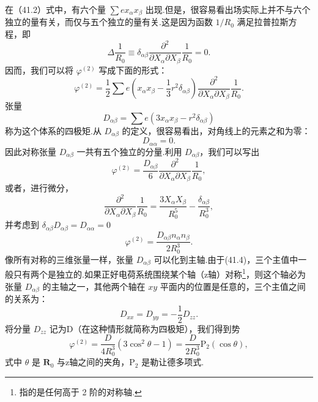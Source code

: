 在（41.2）式中，有六个量 $\sum ex_\alpha x_\beta$ 出现.但是，很容易看出场实际上并不与六个独立的量有关，而仅与五个独立的量有关.这是因为函数 $1/R_0$ 满足拉普拉斯方程，即
\begin{equation*}
  \Delta\frac{1}{R_0}\equiv\delta_{\alpha\beta}
  \frac{\partial^2}{\partial X_\alpha\partial X_\beta}\frac{1}{R_0}=0.
\end{equation*}
因而，我们可以将 $\varphi^{(2)}$ 写成下面的形式：
\begin{equation*}
  \varphi^{(2)}=\frac{1}{2}\sum e\left(x_\alpha x_\beta-\frac{1}{3}r^2\delta_{\alpha\beta}\right)
  \frac{\partial^2}{\partial X_\alpha\partial X_\beta}\frac{1}{R_0}.
\end{equation*}
张量
\begin{equation}
  D_{\alpha\beta}=\sum e(3x_\alpha x_\beta-r^2\delta_{\alpha\beta})
\end{equation}
称为这个体系的四极矩.从 $D_{\alpha\beta}$ 的定义，很容易看出，对角线上的元素之和为零：
\begin{equation}
  D_{\alpha\alpha}=0.
\end{equation}
因此对称张量 $D_{\alpha\beta}$ 一共有五个独立的分量.利用 $D_{\alpha\beta}$，我们可以写出
\begin{equation}
  \varphi^{(2)}=\frac{D_{\alpha\beta}}{6}
  \frac{\partial^2}{\partial X_\alpha\partial X_\beta}\frac{1}{R_0},
\end{equation}
或者，进行微分，
\begin{equation*}
  \frac{\partial^2}{\partial X_\alpha\partial X_\beta}\frac{1}{R_0}
  =\frac{3X_\alpha X_\beta}{R_0^5}-\frac{\delta_{\alpha\beta}}{R_0^3},
\end{equation*}
并考虑到 $\delta_{\alpha\beta}D_{\alpha\beta}=D_{\alpha\alpha}=0$
\begin{equation}
  \varphi^{(2)}=\frac{D_{\alpha\beta}n_\alpha n_\beta}{2R_0^3}.
\end{equation}
像所有对称的三维张量一样，张量 $D_{\alpha\beta}$ 可以化到主轴.由于(41.4)，三个主值中一般只有两个是独立的.如果正好电荷系统围绕某个轴（z轴）对称\footnote{指的是任何高于 2 阶的对称轴.}，则这个轴必为张量 $D_{\alpha\beta}$ 的主轴之一，其他两个轴在 $xy$ 平面内的位置是任意的，三个主值之间的关系为：
\begin{equation}
  D_{xx}=D_{yy}=-\frac{1}{2}D_{zz}.
\end{equation}
将分量 $D_{zz}$ 记为D（在这种情形就简称为四极矩），我们得到势
\begin{equation}
  \varphi^{(2)}=\frac{D}{4R_0^3}(3\cos^2\theta-1)
  =\frac{D}{2R_0^3}\mathrm{P}_2(\cos\theta),
\end{equation}
式中 $\theta$ 是 $\boldsymbol{R}_0$ 与z轴之间的夹角，$\mathrm{P}_2$ 是勒让德多项式.

